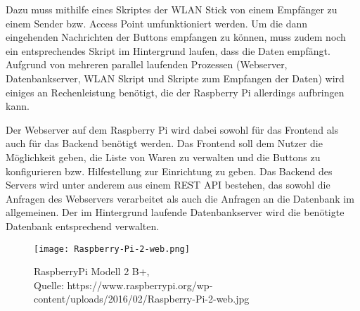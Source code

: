 Dazu muss mithilfe eines Skriptes der \ac{WLAN} Stick von einem Empfänger zu einem Sender bzw. Access Point umfunktioniert werden. Um die dann eingehenden Nachrichten der Buttons empfangen zu können, muss zudem noch ein entsprechendes Skript im Hintergrund laufen, dass die Daten empfängt. Aufgrund von mehreren parallel laufenden Prozessen (Webserver, Datenbankserver, \ac{WLAN} Skript und Skripte zum Empfangen der Daten) wird einiges an Rechenleistung benötigt, die der Raspberry Pi allerdings aufbringen kann. 

Der Webserver auf dem Raspberry Pi wird dabei sowohl für das Frontend als auch für das Backend benötigt werden. Das Frontend soll dem Nutzer die Möglichkeit geben, die Liste von Waren zu verwalten und die Buttons zu konfigurieren bzw. Hilfestellung zur Einrichtung zu geben. Das Backend des Servers wird unter anderem aus einem \ac{REST} \ac{API} bestehen, das sowohl die Anfragen des Webservers verarbeitet als auch die Anfragen an die Datenbank im allgemeinen. 
Der im Hintergrund laufende Datenbankserver wird die benötigte Datenbank entsprechend verwalten. 

\begin{figure}[!htb]
	\centering
	\texttt{[image: Raspberry-Pi-2-web.png]}
	\caption[RaspberryPi Modell 2 B]{RaspberryPi Modell 2 B+,\\ Quelle: https://www.raspberrypi.org/wp-content/uploads/2016/02/Raspberry-Pi-2-web.jpg}
\end{figure}